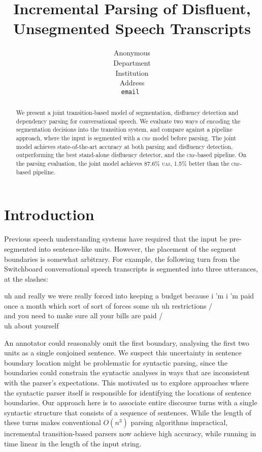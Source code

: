 \documentclass[11pt,letterpaper]{article}
\title{Incremental Parsing of Disfluent, Unsegmented Speech Transcripts}
\author{
	Anonymous\\
  	Department\\
  	Institution\\
  	Address\\
  {\tt \small email }\\
}
\date{}
\begin{document}
\maketitle
\begin{abstract}
We present a joint transition-based model of segmentation, disfluency detection
and dependency parsing for conversational speech.  We evaluate two ways of encoding
the segmentation decisions into the transition system, and compare against a pipeline
approach, where the input is segmented with a \textsc{crf} model before parsing.
The joint model achieves state-of-the-art accuracy at both parsing and disfluency
detection, outperforming the best stand-alone disfluency detector, and the
\textsc{crf}-based pipeline.
On the parsing evaluation, the joint model achieves 87.6\% \textsc{uas}, 1.5\%
better than the \textsc{crf}-based pipeline.
\end{abstract}

\section{Introduction}


Previous speech understanding systems have required that the input be
pre-segmented into sentence-like units.  However, the placement of the segment
boundaries is somewhat arbitrary.  For example, the following turn from the
Switchboard conversational speech transcripts is segmented into three utterances,
at the slashes:

\begin{lexample}
\small
uh and really we were really forced into keeping a budget because i 'm i 'm paid
once a month which sort of sort of forces some uh uh restrictions / \\
and you need to make sure all your bills are paid / \\
uh about yourself
\end{lexample}

\noindent An annotator could reasonably omit the first boundary, analysing
the first two units as a single conjoined sentence.  
We suspect this uncertainty in sentence boundary location
might be problematic for syntactic parsing, since the boundaries could
constrain the syntactic analyses in ways that are inconsistent with the parser's
expectations.  This motivated us to explore approaches where the syntactic parser
itself is responsible for identifying the locations of sentence boundaries.  Our
approach here is to associate entire discourse turns with a single syntactic
structure that consists of a sequence of sentences.
While the length of these turns makes conventional $O(n^3)$ parsing algorithms
impractical, incremental transition-based parsers now achieve high accuracy,
while running in time linear in the length of the input string.
\end{document}
